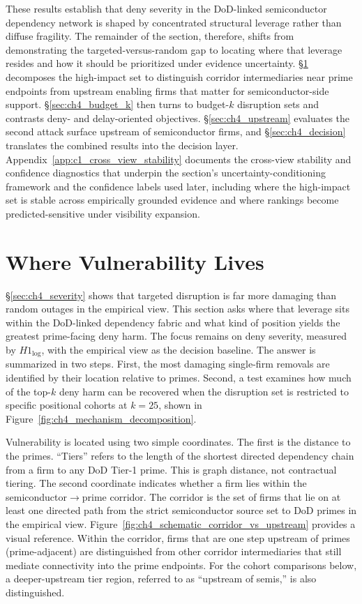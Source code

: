 These results establish that deny severity in the DoD-linked semiconductor dependency network is shaped by concentrated structural leverage rather than diffuse fragility. The remainder of the section, therefore, shifts from demonstrating the targeted-versus-random gap to locating where that leverage resides and how it should be prioritized under evidence uncertainty. \S\ref{sec:ch4_vulnerability} decomposes the high-impact set to distinguish corridor intermediaries near prime endpoints from upstream enabling firms that matter for semiconductor-side support. \S\ref{sec:ch4_budget_k} then turns to budget-$k$ disruption sets and contrasts deny- and delay-oriented objectives. \S\ref{sec:ch4_upstream} evaluates the second attack surface upstream of semiconductor firms, and \S\ref{sec:ch4_decision} translates the combined results into the decision layer. Appendix~\ref{app:c1_cross_view_stability} documents the cross-view stability and confidence diagnostics that underpin the section's uncertainty-conditioning framework and the confidence labels used later, including where the high-impact set is stable across empirically grounded evidence and where rankings become predicted-sensitive under visibility expansion.

\section{Where Vulnerability Lives}
\label{sec:ch4_vulnerability}

\S\ref{sec:ch4_severity} shows that targeted disruption is far more damaging than random outages in the empirical view. This section asks where that leverage sits within the DoD-linked dependency fabric and what kind of position yields the greatest prime-facing deny harm. The focus remains on deny severity, measured by $H1_{\log}$, with the empirical view as the decision baseline. The answer is summarized in two steps. First, the most damaging single-firm removals are identified by their location relative to primes. Second, a test examines how much of the top-$k$ deny harm can be recovered when the disruption set is restricted to specific positional cohorts at $k=25$, shown in Figure~\ref{fig:ch4_mechanism_decomposition}.

Vulnerability is located using two simple coordinates. The first is the distance to the primes. ``Tiers'' refers to the length of the shortest directed dependency chain from a firm to any DoD Tier-1 prime. This is graph distance, not contractual tiering. The second coordinate indicates whether a firm lies within the semiconductor$\rightarrow$prime corridor. The corridor is the set of firms that lie on at least one directed path from the strict semiconductor source set to DoD primes in the empirical view. Figure~\ref{fig:ch4_schematic_corridor_vs_upstream} provides a visual reference. Within the corridor, firms that are one step upstream of primes (prime-adjacent) are distinguished from other corridor intermediaries that still mediate connectivity into the prime endpoints. For the cohort comparisons below, a deeper-upstream tier region, referred to as ``upstream of semis,'' is also distinguished.

